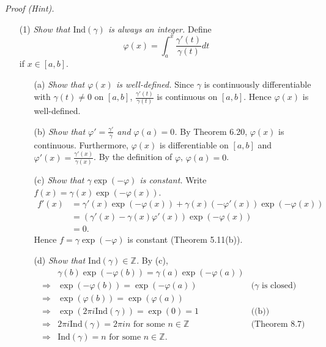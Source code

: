 \documentclass{article}
\begin{document}
\emph{Proof (Hint).}
\begin{enumerate}
\item[(1)]
\emph{Show that $\mathrm{Ind}(\gamma)$ is always an integer.}
Define
\[
  \varphi(x) = \int_{a}^{x} \frac{\gamma'(t)}{\gamma(t)} dt
\]
if $x \in [a,b]$.
  \begin{enumerate}
  \item[(a)]
    \emph{Show that $\varphi(x)$ is well-defined.}
    Since $\gamma$ is continuously differentiable with $\gamma(t) \neq 0$ on $[a,b]$,
    $\frac{\gamma'(t)}{\gamma(t)}$ is continuous on $[a,b]$.
    Hence $\varphi(x)$ is well-defined.

  \item[(b)]
    \emph{Show that $\varphi' = \frac{\gamma'}{\gamma}$ and $\varphi(a) = 0$.}
    By Theorem 6.20,
    $\varphi(x)$ is continuous.
    Furthermore, $\varphi(x)$ is differentiable on $[a,b]$ and
    $\varphi'(x) = \frac{\gamma'(x)}{\gamma(x)}$.
    By the definition of $\varphi$, $\varphi(a) = 0$.

  \item[(c)]
    \emph{Show that $\gamma \exp(-\varphi)$ is constant.}
    Write $f(x) = \gamma(x) \exp(-\varphi(x))$.
    \begin{align*}
      f'(x)
      &= \gamma'(x) \exp(-\varphi(x)) + \gamma(x)(-\varphi'(x)) \exp(-\varphi(x)) \\
      &= (\gamma'(x) - \gamma(x)\varphi'(x)) \exp(-\varphi(x)) \\
      &= 0.
    \end{align*}
    Hence $f = \gamma \exp(-\varphi)$ is constant (Theorem 5.11(b)).

  \item[(d)]
    \emph{Show that $\mathrm{Ind}(\gamma) \in \mathbb{Z}$.}
    By (c),
    \begin{align*}
      &\gamma(b) \exp(-\varphi(b)) = \gamma(a) \exp(-\varphi(a)) \\
      \Longrightarrow&
      \exp(-\varphi(b)) = \exp(-\varphi(a))
        &\text{($\gamma$ is closed)} \\
      \Longrightarrow&
      \exp(\varphi(b)) = \exp(\varphi(a)) \\
      \Longrightarrow&
      \exp(2\pi i \mathrm{Ind}(\gamma)) = \exp(0) = 1
        &\text{((b))} \\
      \Longrightarrow&
      2\pi i \mathrm{Ind}(\gamma) = 2\pi i n \text{ for some } n \in \mathbb{Z}
        &\text{(Theorem 8.7)} \\
      \Longrightarrow&
      \mathrm{Ind}(\gamma) = n \text{ for some } n \in \mathbb{Z}.
    \end{align*}
  \end{enumerate}


\end{enumerate}
\end{document}
